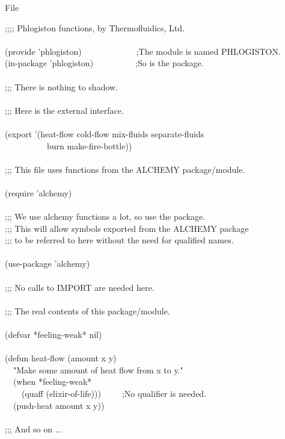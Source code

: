 \begin{table}
\caption{File \protect{}}
\label{PHLOGISTON-FILE-TABLE}
\begin{lisp}
;;;; Phlogiston functions, by Thermofluidics, Ltd. \\
 \\[4pt]
(provide 'phlogiston)~~~~~~~~~~~~~;The module is named PHLOGISTON. \\
(in-package 'phlogiston)~~~~~~~~~~;So is the package. \\
 \\[4pt]
;;; There is nothing to shadow. \\
 \\[4pt]
;;; Here is the external interface. \\
 \\[4pt]
(export '(heat-flow cold-flow mix-fluids separate-fluids \\
~~~~~~~~~~burn make-fire-bottle)) \\
 \\[4pt]
;;; This file uses functions from the ALCHEMY package/module. \\
 \\[4pt]
(require 'alchemy) \\
 \\[4pt]
;;; We use alchemy functions a lot, so use the package. \\
;;; This will allow symbols exported from the ALCHEMY package \\
;;; to be referred to here without the need for qualified names. \\
 \\[4pt]
(use-package 'alchemy) \\
 \\[4pt]
;;; No calls to IMPORT are needed here. \\
 \\[4pt]
;;; The real contents of this package/module. \\
\\[4pt]
(defvar *feeling-weak* nil) \\
 \\[4pt]
(defun heat-flow (amount x y) \\
~~"Make some amount of heat flow from x to y." \\
~~(when *feeling-weak* \\
~~~~(quaff (elixir-of-life)))~~~~~;No qualifier is needed. \\
~~(push-heat amount x y)) \\
 \\[4pt]
;;; And so on ...
\end{lisp}
\vfill
\end{table}

